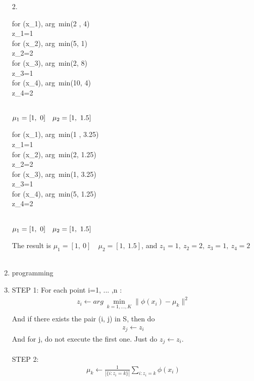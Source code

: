 \documentclass[12pt]{article}
\begin{document}
\begin{enumerate}[label=(\alph*)]
2.
\begin{center}
  for \phi(x_1), arg\ min(2 , 4)\\
  z_1=1\\
  for \phi(x_2), arg\ min(5, 1)\\
  z_2=2\\
  for \phi(x_3), arg\ min(2, 8)\\
  z_3=1\\
  for \phi(x_4), arg\ min(10, 4)\\
  z_4=2\\\\
\end{center}
\begin{center}
  $\mu_1=[1, \ 0] \quad \mu_2=[1, \ 1.5]\\\\$
\end{center}

\begin{center}
  for \phi(x_1), arg\ min(1 , 3.25)\\
  z_1=1\\
  for \phi(x_2), arg\ min(2, 1.25)\\
  z_2=2\\
  for \phi(x_3), arg\ min(1, 3.25)\\
  z_3=1\\
  for \phi(x_4), arg\ min(5, 1.25)\\
  z_4=2\\\\
\end{center}
\begin{center}
  $\mu_1=[1, \ 0] \quad \mu_2=[1, \ 1.5]\\\\$
\end{center}
The result is $\mu_1=[1, \ 0] \quad \mu_2=[1, \ 1.5]$, and $z_1=1,\ z_2=2,\ z_3=1,\ z_4=2$\\\\

\item programming

\item
STEP 1:
For each point i=1, ... ,n :
\begin{align*}
  z_i \leftarrow arg \ \min_{k=1,...,K}\parallel\phi(x_i)-\mu_k\parallel^2\\
\end{align*}
And if there exists the pair (i, j) in S, then do\\
\begin{align*}
  z_j \leftarrow z_i
\end{align*}
And for j, do not execute the first one. Just do $z_j \leftarrow z_i$.\\\\

STEP 2:
\begin{align*}
  \mu_k\leftarrow \frac{1}{|\{ i: z_i = k\}|}\sum_{i:z_i=k} \phi(x_i)\\
\end{align*}



\end{enumerate}
\end{document}
